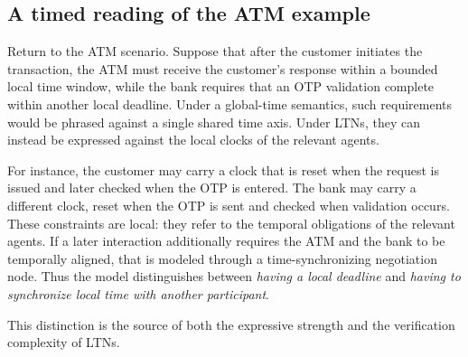 \subsection{A timed reading of the ATM example}

Return to the ATM scenario. Suppose that after the customer initiates the transaction, the ATM must receive the customer's response within a bounded local time window, while the bank requires that an OTP validation complete within another local deadline. Under a global-time semantics, such requirements would be phrased against a single shared time axis. Under LTNs, they can instead be expressed against the local clocks of the relevant agents.

For instance, the customer may carry a clock that is reset when the request is issued and later checked when the OTP is entered. The bank may carry a different clock, reset when the OTP is sent and checked when validation occurs. These constraints are local: they refer to the temporal obligations of the relevant agents. If a later interaction additionally requires the ATM and the bank to be temporally aligned, that is modeled through a time-synchronizing negotiation node. Thus the model distinguishes between \emph{having a local deadline} and \emph{having to synchronize local time with another participant}.

This distinction is the source of both the expressive strength and the verification complexity of LTNs.

